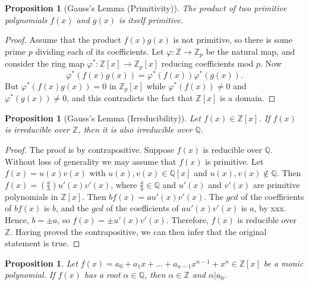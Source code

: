 \documentclass[draft]{article}
\newtheorem{prop}[thm]{Proposition}
\theoremstyle{definition}
\theoremstyle{remark}
\begin{document}
		    \begin{prop}[Gauss's Lemma (Primitivity)]
		        The product of two primitive polynomials $f(x)$ and $g(x)$ is itself primitive.
		    \end{prop}
		    
		    \begin{proof}
		        Assume that the product $f(x)g(x)$ is not primitive, so there is some prime $p$ dividing each of its coefficients. Let $\varphi: \mathbb{Z} \to \mathbb{Z}_p$ be the natural map, and consider the ring map $\varphi^{*}: \mathbb{Z}[x] \to \mathbb{Z}_p[x]$ reducing coefficients mod $p$. Now
		        \begin{equation*}
		            \varphi^{*}(f(x)g(x)) = \varphi^{*}(f(x))\varphi^{*}(g(x)).
		        \end{equation*}
		        But $\varphi^{*}(f(x)g(x)) = 0$ in $\mathbb{Z}_p[x]$ while $\varphi^{*}(f(x)) \neq 0$ and $\varphi^{*}(g(x)) \neq 0$, and this contradicts the fact that $\mathbb{Z}[x]$ is a domain.
		    \end{proof}
			
			\begin{prop}[Gauss's Lemma (Irreducibility)]
				Let $f(x) \in \mathbb{Z}[x]$. If $f(x)$ is irreducible over $\mathbb{Z}$, then it is also irreducible over $\mathbb{Q}$.
			\end{prop}
			
			\begin{proof}
				The proof is by contrapositive. Suppose $f(x)$ is reducible over $\mathbb{Q}$. Without loss of generality we may assume that $f(x)$ is primitive. Let $f(x) = u(x)v(x)$ with $u(x), v(x) \in \mathbb{Q}[x]$ and $u(x), v(x) \notin \mathbb{Q}$. Then $f(x) = (\frac{a}{b})u'(x)v'(x)$, where $\frac{a}{b} \in \mathbb{Q}$ and $u'(x)$ and $v'(x)$ are primitive polynomials in $\mathbb{Z}[x]$. Then $bf(x) = au'(x)v'(x)$. The $gcd$ of the coefficients of $bf(x)$ is $b$, and the $gcd$ of the coefficients of $au'(x)v'(x)$ is $a$, by xxx. Hence, $b = \pm a$, so $f(x) = \pm u'(x)v'(x)$. Therefore, $f(x)$ is reducible over $\mathbb{Z}$. Having proved the contrapositive, we can then infer that the original statement is true.
			\end{proof}
			
			\begin{prop}
				Let $f(x) = a_0 + a_1x + \dots + a_{n - 1}x^{n - 1} + x^n \in \mathbb{Z}[x]$ be a monic polynomial. If $f(x)$ has a root $\alpha \in \mathbb{Q}$, then $\alpha \in \mathbb{Z}$ and $\alpha | a_0$.
			\end{prop}
			
\end{document}
